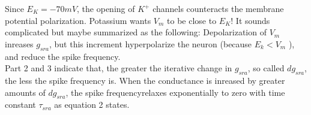 \documentclass{article}
\begin{document}
Since $E_{K}=-70 mV$, the opening of $K^{+}$ channels counteracts the membrane potential polarization. Potassium wants $V_{m}$ to be close to $E_{K}$! It sounds complicated but maybe summarized as the following: Depolarization of $V_{m}$ inreases $g_{sra}$, but this increment hyperpolarize the neuron (because $E_{k}<V_{m}$ ), and reduce the spike frequency.\\

 Part 2 and 3 indicate that, the greater the iterative change in $g_{sra}$, so called $dg_{sra}$, the less the spike frequency is. When the conductance is inreased by greater amounts of $dg_{sra}$, the spike frequencyrelaxes exponentially to zero with time constant $\tau_{sra}$ as equation 2 states. 
\end{document}
